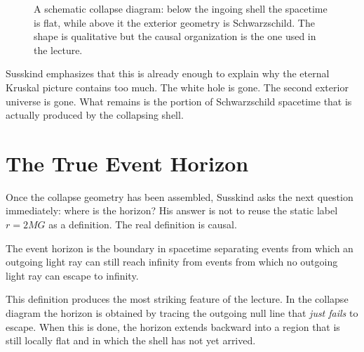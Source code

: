 \begin{figure}[ht]
\centering
{}
\caption{A schematic collapse diagram: below the ingoing shell the spacetime is flat, while above it the exterior geometry is Schwarzschild. The shape is qualitative but the causal organization is the one used in the lecture.}
\end{figure}

Susskind emphasizes that this is already enough to explain why the eternal Kruskal picture contains too much. The white hole is gone. The second exterior universe is gone. What remains is the portion of Schwarzschild spacetime that is actually produced by the collapsing shell.

\section{The True Event Horizon}

Once the collapse geometry has been assembled, Susskind asks the next question immediately: where is the horizon? His answer is not to reuse the static label \(r=2MG\) as a definition. The real definition is causal.

\begin{definition}
The event horizon is the boundary in spacetime separating events from which an outgoing light ray can still reach infinity from events from which no outgoing light ray can escape to infinity.
\end{definition}

This definition produces the most striking feature of the lecture. In the collapse diagram the horizon is obtained by tracing the outgoing null line that \emph{just fails} to escape. When this is done, the horizon extends backward into a region that is still locally flat and in which the shell has not yet arrived.

